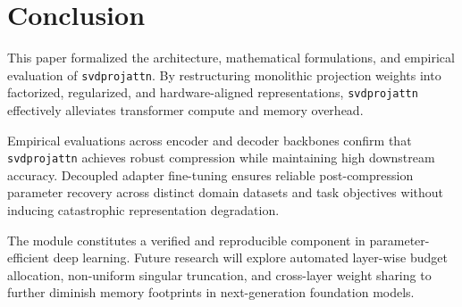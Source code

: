 \section{Conclusion}
This paper formalized the architecture, mathematical formulations, and empirical evaluation of \texttt{svdprojattn}. By restructuring monolithic projection weights into factorized, regularized, and hardware-aligned representations, \texttt{svdprojattn} effectively alleviates transformer compute and memory overhead.

Empirical evaluations across encoder and decoder backbones confirm that \texttt{svdprojattn} achieves robust compression while maintaining high downstream accuracy. Decoupled adapter fine-tuning ensures reliable post-compression parameter recovery across distinct domain datasets and task objectives without inducing catastrophic representation degradation.

The module constitutes a verified and reproducible component in parameter-efficient deep learning. Future research will explore automated layer-wise budget allocation, non-uniform singular truncation, and cross-layer weight sharing to further diminish memory footprints in next-generation foundation models.
